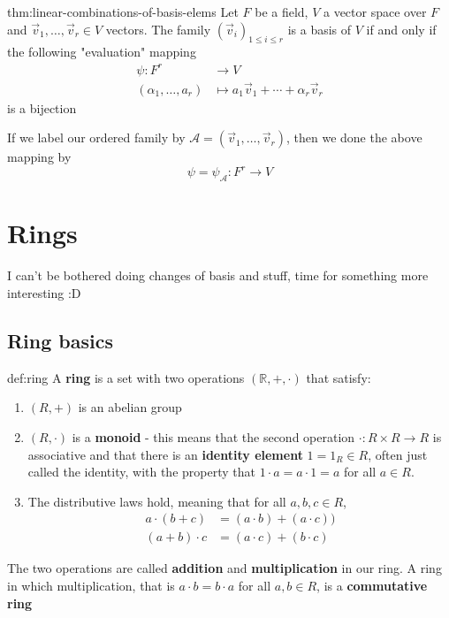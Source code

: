 \documentclass{article}
\begin{document}
\begin{thm}{thm:linear-combinations-of-basis-elems}{}
    Let $F$ be a field, $V$ a vector space over $F$ and $\vec{v}_{1},\dots,\vec{v}_{r}\in V$ vectors. The family $(\vec{v}_{i})_{1\le i\le r}$ is a basis of $V$ if and only if the following "evaluation" mapping
    \begin{align*}
        \psi : F^{r} &\to V\\
        (\alpha_{1},\dots,a_{r}) &\mapsto a_{1}\vec{v}_{1} + \cdots + \alpha_{r}\vec{v}_{r}
    \end{align*}
    is a bijection

    If we label our ordered family by $\mathcal{A} = (\vec{v}_{1},\dots,\vec{v}_{r})$, then we done the above mapping by
    \[\psi = \psi_{\mathcal{A}} : F^{r}\to V\]
\end{thm}

\newpage
\section{Rings}
I can't be bothered doing changes of basis and stuff, time for something more interesting :D 

\subsection{Ring basics}
\begin{dfn}{def:ring}{}
    A \textbf{ring} is a set with two operations $(\mathbb{R}, +, \cdot)$ that satisfy:
    \begin{enumerate}
        \item $(R, +)$ is an abelian group
        \item $(R, \cdot)$ is a \textbf{monoid} - this means that the second operation $\cdot : R \times R \to R$ is associative and that there is an \textbf{identity element} $1 = 1_{R}\in R$, often just called the identity, with the property that $1 \cdot a = a \cdot 1 = a$ for all $a\in R$.
        \item The distributive laws hold, meaning that for all $a,b,c\in R$,
            \begin{align*}
                a \cdot (b + c) &= (a \cdot b) + (a \cdot c)) \\
                (a + b) \cdot c &= (a \cdot c) + (b \cdot c)
            \end{align*}
    \end{enumerate}
    The two operations are called \textbf{addition} and \textbf{multiplication} in our ring. A ring in which multiplication, that is $a \cdot b = b \cdot a$ for all $a,b\in R$, is a \textbf{commutative ring}
\end{dfn}
\end{document}
